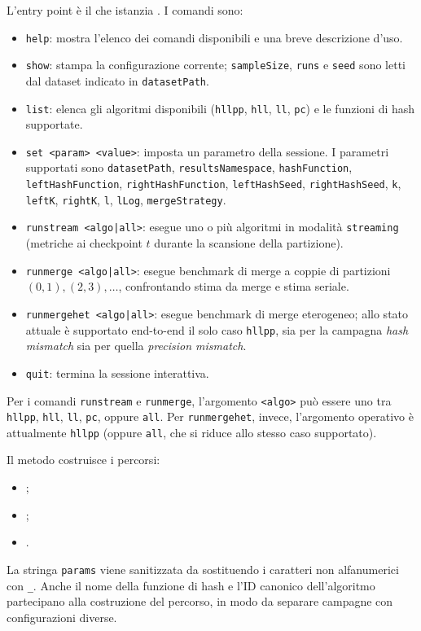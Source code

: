 L'entry point è il  che istanzia . I comandi sono:

	\begin{itemize}
	    \item \texttt{help}: mostra l'elenco dei comandi disponibili e una breve descrizione d'uso.
	    \item \texttt{show}: stampa la configurazione corrente; \texttt{sampleSize}, \texttt{runs} e \texttt{seed} sono letti dal dataset indicato in \texttt{datasetPath}.
	    \item \texttt{list}: elenca gli algoritmi disponibili (\texttt{hllpp}, \texttt{hll}, \texttt{ll}, \texttt{pc}) e le funzioni di hash supportate.
	    \item \texttt{set <param> <value>}: imposta un parametro della sessione. I parametri supportati sono \texttt{datasetPath}, \texttt{resultsNamespace}, \texttt{hashFunction}, \texttt{leftHashFunction}, \texttt{rightHashFunction}, \texttt{leftHashSeed}, \texttt{rightHashSeed}, \texttt{k}, \texttt{leftK}, \texttt{rightK}, \texttt{l}, \texttt{lLog}, \texttt{mergeStrategy}.
	    \item \texttt{runstream <algo|all>}: esegue uno o più algoritmi in modalità \texttt{streaming} (metriche ai checkpoint \(t\) durante la scansione della partizione).
	    \item \texttt{runmerge <algo|all>}: esegue benchmark di merge a coppie di partizioni \((0,1),(2,3),\dots\), confrontando stima da merge e stima seriale.
	    \item \texttt{runmergehet <algo|all>}: esegue benchmark di merge eterogeneo; allo stato attuale è supportato end-to-end il solo caso \texttt{hllpp}, sia per la campagna \emph{hash mismatch} sia per quella \emph{precision mismatch}.
	    \item \texttt{quit}: termina la sessione interattiva.
	\end{itemize}

	Per i comandi \texttt{runstream} e \texttt{runmerge}, l'argomento
	\texttt{<algo>} può essere uno tra \texttt{hllpp}, \texttt{hll}, \texttt{ll},
	\texttt{pc}, oppure \texttt{all}.
	Per \texttt{runmergehet}, invece, l'argomento operativo è attualmente
	\texttt{hllpp} (oppure \texttt{all}, che si riduce allo stesso caso supportato).

	Il metodo  costruisce i percorsi:
	\begin{itemize}
	    \item {};
	    \item {};
	    \item {}.
	\end{itemize}
La stringa \texttt{params} viene sanitizzata da
 sostituendo i caratteri non alfanumerici con
\texttt{\_}. Anche il nome della funzione di hash e l'ID canonico dell'algoritmo
partecipano alla costruzione del percorso, in modo da separare campagne con
configurazioni diverse.

